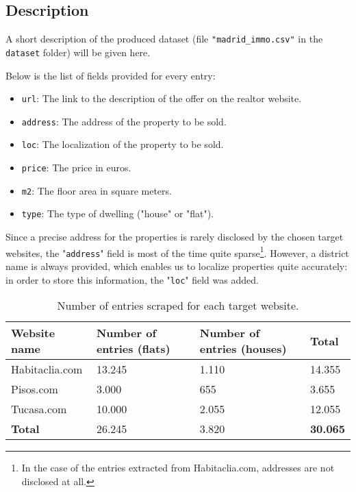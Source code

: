 \documentclass{article}
\newcommand{\ezskip}{\medskip\noindent}
\begin{document}
\begin{normalsize}
		\subsection{Description}
        
        A short description of the produced dataset (file \texttt{"madrid\_immo.csv"} in the \texttt{dataset} folder) will be given here. \ezskip
        
        Below is the list of fields provided for every entry:

        \begin{itemize}
            \item \texttt{url}: The link to the description of the offer on the realtor website.
            \item \texttt{address}: The address of the property to be sold.
            \item \texttt{loc}: The localization of the property to be sold.
            \item \texttt{price}: The price in euros.
            \item \texttt{m2}: The floor area in square meters.
            \item \texttt{type}: The type of dwelling ("house" or "flat").
        \end{itemize}
        
        Since a precise address for the properties is rarely disclosed by the chosen target websites, the "\texttt{address}" field is most of the time quite sparse\footnote{In the case of the entries extracted from Habitaclia.com, addresses are not disclosed at all.}. However, a district name is always provided, which enables us to localize properties quite accurately: in order to store this information, the "\texttt{loc}" field was added.
        
        \ezskip
        
    	\begin{table}[h!]
          \begin{center}
            \label{tab:table2}
            \begin{tabular}{l|l|l|l}
                \textbf{Website name} & \textbf{Number of entries (flats)} & \textbf{Number of entries (houses)} & \textbf{Total}\\ %
                \hline
                Habitaclia.com & 13.245 & 1.110 & 14.355 \\ %
                Pisos.com      & 3.000  & 655   & 3.655  \\ %
                Tucasa.com     & 10.000 & 2.055 & 12.055 \\ %
                \hline
                \textbf{Total} & 26.245 & 3.820 & \textbf{30.065} \\ %
            \end{tabular}
            \caption{Number of entries scraped for each target website.}
          \end{center}
        \end{table}


\end{normalsize}
\end{document}
